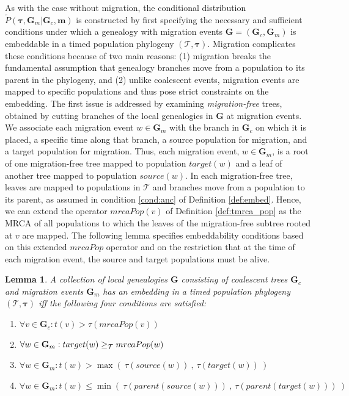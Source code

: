 \documentclass[11pt]{article}
\newcommand{\vect}[1]{\boldsymbol{\mathbf{#1}}}
\newcommand{\Tr}{\mathcal{T}}
\newcommand{\G}{\vect{G}}
\newcommand{\Pref}{\widetilde{P}}
\newcommand{\1}{\mathbbm{1}}
\newcommand{\Gc}{\G_c}
\newcommand{\Gm}{\G_m}
\newtheorem{lemma}{Lemma}
\newcommand{\taus}{\vect\tau}
\newcommand{\migs}{\vect{m}}
\begin{document}
As with the case without migration, the conditional distribution $\Pref(\taus,\Gm|\Gc,\migs)$ is constructed by first specifying the necessary and sufficient conditions
under which a genealogy with migration events $\G=(\Gc,\Gm)$ is embeddable in a timed population phylogeny $(\Tr,\taus)$.
%
Migration complicates these conditions because of two main reasons:
(1) migration breaks the fundamental assumption that genealogy branches move from a population to its parent in the phylogeny,
and (2) unlike coalescent events, migration events are mapped to specific populations and thus pose strict constraints on the embedding.
%
The first issue is addressed by examining \emph{migration-free} trees, obtained by cutting branches of the local genealogies in $\G$ at migration events.
%
We associate each migration event  $w\in\Gm$ with the branch in $\Gc$ on which it is placed, a specific time along that branch, a source population for migration, and a target population for migration.
%
Thus, each migration event, $w\in\Gm$, is a root of one migration-free tree mapped to population $target(w)$ and a leaf of another tree mapped to population $source(w)$.
%
In each migration-free tree, leaves are mapped to populations in $\Tr$ and branches move from a population to its parent, as assumed in condition \ref{cond:anc} of Definition \ref{def:embed}.
Hence, we can extend the operator $mrcaPop(v)$ of Definition \ref{def:tmrca_pop} as the MRCA of all populations to which the leaves of the migration-free subtree rooted at $v$ are mapped.
%
The following lemma specifies embeddability conditions based on this extended $mrcaPop$ operator and on the restriction that at the time of each migration event,
the source and target populations must be alive.


\begin{lemma}\label{lem:embed_mig}
 A collection of local genealogies $\G$  consisting of coalescent trees $\Gc$ and migration events $\Gm$ has an embedding in a timed population phylogeny $(\Tr,\taus)$ iff
 the following four conditions are satisfied:
 \begin{enumerate}
  \item \label{cond:ub_coal}  $\forall v\in \Gc: t(v) > \tau(mrcaPop(v))$
  \item \label{cond:mrca_mig} $\forall w\in\Gm: target(w)\anc mrcaPop(w)$
  \item \label{cond:ub_mig}   $\forall w\in\Gm: t(w) > \max(~\tau(source(w))~,~\tau(target(w))~)$
  \item \label{cond:lb_mig}   $\forall w\in\Gm: t(w) \leq \min(~\tau(parent(source(w)))~,~\tau(parent(target(w)))~)$
 \end{enumerate}
\end{lemma}
\end{document}
